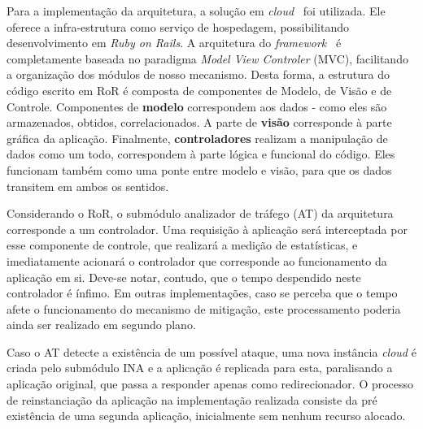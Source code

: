 Para a implementação da arquitetura, a solução em \emph{cloud}~\cite{heroku} foi utilizada. Ele oferece a infra-estrutura como serviço de hospedagem, possibilitando desenvolvimento em \emph{Ruby on Rails}. %
%
%
A arquitetura do \emph{framework}~\cite{ror} é completamente baseada no paradigma \emph{Model View Controler} (MVC), facilitando a organização dos módulos de nosso mecanismo. Desta forma, a estrutura do código escrito em RoR é composta de componentes de Modelo, de Visão e de Controle. Componentes de \textbf{modelo} correspondem aos dados - como eles são armazenados, obtidos, correlacionados. A parte de \textbf{visão} corresponde à parte gráfica da aplicação. Finalmente, \textbf{controladores} realizam a manipulação de dados como um todo, correspondem à parte lógica e funcional do código. Eles funcionam também como uma ponte entre modelo e visão, para que os dados transitem em ambos os sentidos.
%

Considerando o RoR, o submódulo analizador de tráfego (AT) da arquitetura corresponde a um controlador. Uma requisição à aplicação será interceptada por esse componente de controle, que realizará a medição de estatísticas, e imediatamente acionará o controlador que corresponde ao funcionamento da aplicação em si. Deve-se notar, contudo, que o tempo despendido neste controlador é ínfimo. Em outras implementações, caso se perceba que o tempo afete o funcionamento do mecanismo de mitigação, este processamento poderia ainda ser realizado em segundo plano.

Caso o AT detecte a existência de um possível ataque, uma nova instância \emph{cloud} é criada pelo submódulo INA e a aplicação é replicada para esta, paralisando a aplicação original, que passa a responder apenas como redirecionador. O processo de reinstanciação da aplicação na implementação realizada consiste da pré existência de uma segunda aplicação, inicialmente sem nenhum recurso alocado. %

